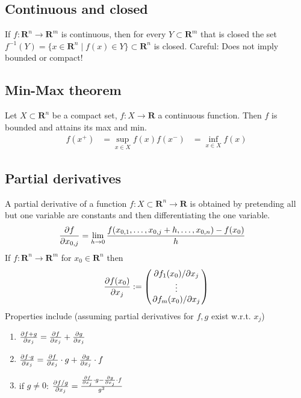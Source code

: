 \documentclass[8pt]{extarticle}
\newcommand{\R}{{\mathbb R}}
\newcommand{\X}{{\mathcal X}}
\newcommand{\ra}{{\rightarrow}}
\def\R{\mathbf{R}}
\def\X{X}
\begin{document}
\begin{multicols*}{3}
  \subsection{Continuous and closed}
  If $f: \R^n \ra \R^m$ is continuous, then for
  every $Y \subset \R^m$ that is closed the set
  $f^{-1}(Y) = \{x \in \R^n \;|\; f(x) \in Y\} \subset \R^n$
  is closed. Careful: Does not imply bounded or compact!
  \subsection{Min-Max theorem}
  Let $\X \subset \R^n$ be a compact set,
  $f: \X \ra \R$ a continuous function.
  Then $f$ is bounded and attains its max and min.
  \begin{align*}
    f(x^+) & = \sup_{x \in \X} f(x)
    f(x^-) & = \inf_{x \in \X} f(x)
  \end{align*}

  \subsection{Partial derivatives}
  A partial derivative of a function
  $f: \X \subset \R^n \ra \R$
  is obtained by pretending all
  but one variable are constants and then differentiating
  the one variable.
  \begin{align*}
    \pdv{f}{x_{0, j}} & = \lim_{h \ra 0} \frac{f(x_{0, 1}, \dots, x_{0, j} + h, \dots, x_{0, n}) - f(x_0)}{h}
  \end{align*}
  If $f: \R^n \ra \R^m$
  for $x_0 \in \R^n$ then
  \begin{align*}
    \pdv{f(x_0)}{x_j} := \begin{pmatrix}
      \pdv*{f_1(x_0)}{x_j} \\
      \vdots               \\
      \pdv*{f_m(x_0)}{x_j} \\
    \end{pmatrix}
  \end{align*}
  Properties include (assuming partial derivatives for $f, g$ exist w.r.t. $x_j$)
  \begin{enumerate}[label=(\arabic*)]
    \item $\pdv{f + g}{x_j} = \pdv{f}{x_j} + \pdv{g}{x_j}$
    \item $\pdv{f \cdot g}{x_j} = \pdv{f}{x_j} \cdot g + \pdv{g}{x_j} \cdot f$
    \item if $g \neq 0$: $\pdv{f / g}{x_j} = \frac{\pdv{f}{x_j} \cdot g - \pdv{g}{x_j} \cdot f}{g^2}$
  \end{enumerate}


\end{multicols*}
\end{document}
